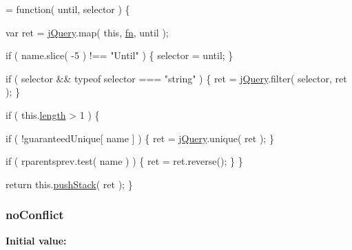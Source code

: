 \begin{DoxyCode}
= \textcolor{keyword}{function}( until, selector ) \{


        var ret = \hyperlink{jquery-1_810_82-vsdoc_8js_add5237586d970a38a81f990e8eb28c6c}{jQuery}.map( \textcolor{keyword}{this}, \hyperlink{jquery-1_810_82-vsdoc_8js_acef6bdaf6b9b20fdcca1ea86f0902c3b}{fn}, until );

        \textcolor{keywordflow}{if} ( name.slice( -5 ) !== \textcolor{stringliteral}{"Until"} ) \{
            selector = until;
        \}

        \textcolor{keywordflow}{if} ( selector && typeof selector === \textcolor{stringliteral}{"string"} ) \{
            ret = \hyperlink{jquery-1_810_82-vsdoc_8js_add5237586d970a38a81f990e8eb28c6c}{jQuery}.filter( selector, ret );
        \}

        \textcolor{keywordflow}{if} ( this.\hyperlink{jquery-1_810_82-vsdoc_8js_aa7de35d58da66d9944ab9cbe82c19640}{length} > 1 ) \{
            
            \textcolor{keywordflow}{if} ( !guaranteedUnique[ name ] ) \{
                ret = \hyperlink{jquery-1_810_82-vsdoc_8js_add5237586d970a38a81f990e8eb28c6c}{jQuery}.unique( ret );
            \}

            
            \textcolor{keywordflow}{if} ( rparentsprev.test( name ) ) \{
                ret = ret.reverse();
            \}
        \}

        \textcolor{keywordflow}{return} this.\hyperlink{jquery-1_810_82-vsdoc_8js_afc3a7db1ef2b526338c06c07cecccd44}{pushStack}( ret );
    \}
\end{DoxyCode}
\hypertarget{jquery-1_810_82-vsdoc_8js_aa31bbacd7a4c583bc450398f96a6f439}{
\subsubsection[{no\-Conflict}]{ no\-Conflict}}\label{jquery-1_810_82-vsdoc_8js_aa31bbacd7a4c583bc450398f96a6f439}
{\bfseries Initial value\-:}
